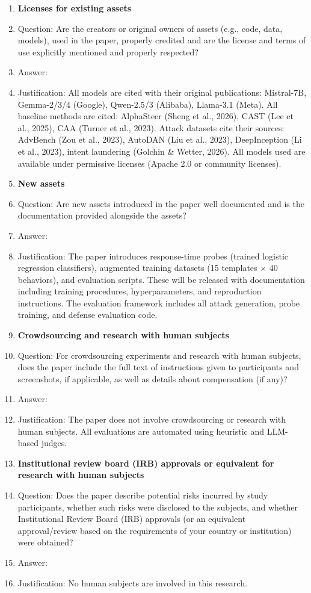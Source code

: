\begin{enumerate}
\item {\bf Licenses for existing assets}
    \item[] Question: Are the creators or original owners of assets (e.g., code, data, models), used in the paper, properly credited and are the license and terms of use explicitly mentioned and properly respected?
    \item[] Answer: \answerYes{}
    \item[] Justification: All models are cited with their original publications: Mistral-7B, Gemma-2/3/4 (Google), Qwen-2.5/3 (Alibaba), Llama-3.1 (Meta). All baseline methods are cited: AlphaSteer (Sheng et al., 2026), CAST (Lee et al., 2025), CAA (Turner et al., 2023). Attack datasets cite their sources: AdvBench (Zou et al., 2023), AutoDAN (Liu et al., 2023), DeepInception (Li et al., 2023), intent laundering (Golchin \& Wetter, 2026). All models used are available under permissive licenses (Apache 2.0 or community licenses).

\item {\bf New assets}
    \item[] Question: Are new assets introduced in the paper well documented and is the documentation provided alongside the assets?
    \item[] Answer: \answerYes{}
    \item[] Justification: The paper introduces response-time probes (trained logistic regression classifiers), augmented training datasets (15 templates $\times$ 40 behaviors), and evaluation scripts. These will be released with documentation including training procedures, hyperparameters, and reproduction instructions. The evaluation framework includes all attack generation, probe training, and defense evaluation code.

\item {\bf Crowdsourcing and research with human subjects}
    \item[] Question: For crowdsourcing experiments and research with human subjects, does the paper include the full text of instructions given to participants and screenshots, if applicable, as well as details about compensation (if any)?
    \item[] Answer: \answerNA{}
    \item[] Justification: The paper does not involve crowdsourcing or research with human subjects. All evaluations are automated using heuristic and LLM-based judges.

\item {\bf Institutional review board (IRB) approvals or equivalent for research with human subjects}
    \item[] Question: Does the paper describe potential risks incurred by study participants, whether such risks were disclosed to the subjects, and whether Institutional Review Board (IRB) approvals (or an equivalent approval/review based on the requirements of your country or institution) were obtained?
    \item[] Answer: \answerNA{}
    \item[] Justification: No human subjects are involved in this research.


\end{enumerate}
